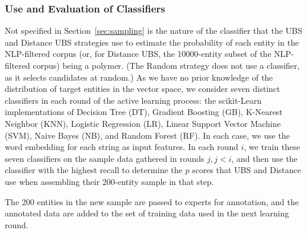 \subsubsection{Use and Evaluation of Classifiers}
Not specified in Section~\ref{sec:sampling} is the nature of the classifier that the UBS and Distance UBS strategies
use to estimate the probability of each entity in the NLP-filtered corpus (or, for Distance UBS,
the \num{10000}-entity subset of the NLP-filtered corpus) being a polymer.
(The Random strategy does not use a classifier, as it selects candidates at random.)
As we have no prior knowledge of the distribution of target entities in the vector space, 
we consider seven distinct classifiers in each round of the active learning process:
the scikit-Learn~\cite{scikit-learn} implementations of Decision Tree (DT), Gradient Boosting (GB), K-Nearest Neighbor (KNN), Logistic Regression (LR), Linear Support Vector Machine (SVM), Naive Bayes (NB), and Random Forest (RF).
In each case, we use the word embedding for each string as input features.
In each round $i$, we train these seven classifiers on the sample data gathered in rounds $j, j<i$,
and then use the classifier with the highest recall to determine the $p$ scores that UBS and Distance use when
assembling their 200-entity sample in that step.


The 200 entities in the new sample are passed to experts for annotation,
and the annotated data are added to the set of training data used in the next learning round.


